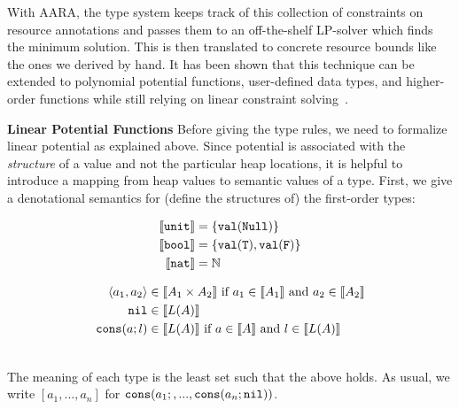\documentclass{easychair}
\newcommand{\irl}[1]{\mathtt{#1}}
\newcounter{rule}
\newcommand{\denote}[1]{\llbracket#1\rrbracket}
\newcommand{\val}[1]{\irl{val}(#1)}
\theoremstyle{definition}
\begin{document}
With AARA, the type system keeps track of this collection of constraints on
resource annotations and passes them to an off-the-shelf LP-solver 
which finds the minimum solution. This is then translated to concrete resource bounds
like the ones we derived by hand. It has been shown that this technique can be extended
to polynomial potential functions, user-defined data types, and higher-order functions while
still relying on linear constraint solving~\cite{HoffmannAH10,HoffmannW15}.
%

\textbf{Linear Potential Functions}\label{sect:lfp}
Before giving the type rules, we need to formalize linear potential as explained above.
Since potential is associated with the \emph{structure} of a value and not the particular heap 
locations, it is helpful to introduce a mapping from
heap values to semantic values of a type. 
First, we give a denotational semantics for (define the structures of) the first-order types: 
  \begin{minipage}{0.4\linewidth}
\begin{align*}
	\denote{\unittyabt} &= \{\val{\irl{Null}}\}\\
	\denote{\booltyabt} &= \{\val{\irl{T}}, \val{\irl{F}}\}\\
	\denote{\irl{nat}} &= \mathbb{N}\\
\end{align*}
  \end{minipage}%
\begin{minipage}{0.6\linewidth}
\begin{align*}
\pairexcst{a_1}{a_2} &\in \denote{\prodtycst{A_1}{A_2}} 
	\text{ if } a_1 \in \denote{A_1} \text{ and } a_2 \in \denote{A_2}\\
\nilexcst &\in \denote{L(A)}\\
\consexcst{a}{l} &\in \denote{L(A)} \text{ if } a \in \denote{A} \text{ and } l \in \denote{L(A)}\\
\end{align*}
  \end{minipage}\\
The meaning of each type is the least set such that the above holds. As usual, we write $[a_1,...,a_n]$ for ${\mathtt{cons}}\mathtt{(}{a_1;,...,{\mathtt{cons}}\mathtt{(}{a_n;\mathtt{nil}}\mathtt{)}}\mathtt{)}$.
\end{document}
